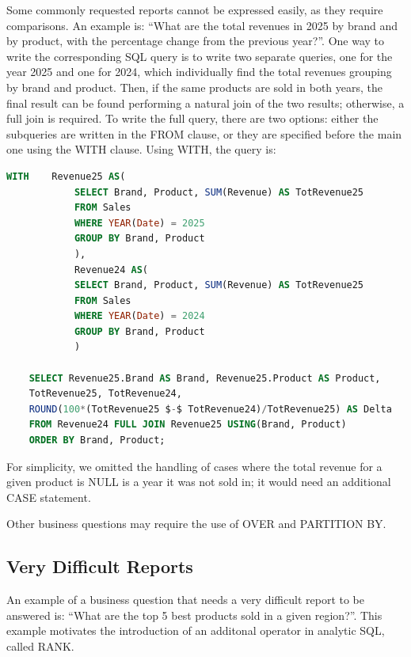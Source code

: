 Some commonly requested reports cannot be expressed easily, as they require comparisons. An example is: ``What are the total revenues in 2025 by brand and by product, with the percentage change from the previous year?''. One way to write the corresponding SQL query is to write two separate queries, one for the year 2025 and one for 2024, which individually find the total revenues grouping by brand and product. Then, if the same products are sold in both years, the final result can be found performing a natural join of the two results; otherwise, a full join is required. To write the full query, there are two options: either the subqueries are written in the FROM clause, or they are specified before the main one using the WITH clause. Using WITH, the query is:
\begin{lstlisting}[language=SQL, mathescape]
    WITH    Revenue25 AS(
            SELECT Brand, Product, SUM(Revenue) AS TotRevenue25 
            FROM Sales
            WHERE YEAR(Date) = 2025
            GROUP BY Brand, Product
            ),
            Revenue24 AS(
            SELECT Brand, Product, SUM(Revenue) AS TotRevenue25 
            FROM Sales
            WHERE YEAR(Date) = 2024
            GROUP BY Brand, Product
            )

    SELECT Revenue25.Brand AS Brand, Revenue25.Product AS Product,
    TotRevenue25, TotRevenue24,
    ROUND(100*(TotRevenue25 $-$ TotRevenue24)/TotRevenue25) AS Delta
    FROM Revenue24 FULL JOIN Revenue25 USING(Brand, Product)
    ORDER BY Brand, Product;
\end{lstlisting}
For simplicity, we omitted the handling of cases where the total revenue for a given product is NULL is a year it was not sold in; it would need an additional CASE statement.

Other business questions may require the use of OVER and PARTITION BY.

\subsection{Very Difficult Reports}

An example of a business question that needs a very difficult report to be answered is: ``What are the top 5 best products sold in a given region?''. This example motivates the introduction of an additonal operator in analytic SQL, called RANK.

